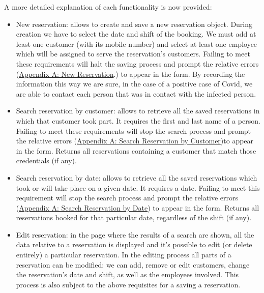 \documentclass{article}
\begin{document}
    
    A more detailed explanation of each functionality is now provided:

    \begin{itemize}
        \item New reservation: allows to create and save a new reservation object.
        During creation we have to select the date and shift of the booking.
        We must add at least one customer (with its mobile
        number) and select at least one employee which will be assigned to serve
        the reservation's customers.
        Failing to meet these requirements will halt the saving
        process and prompt the relative errors
        (\hyperref[sec:new_reservation_form_errors]{Appendix A: New Reservation}.)
        to appear in the form.
        By recording the information this way we are sure, in the case of
        a positive case of Covid, we are able to contact each person that
        was in contact with the infected person.


        \item Search reservation by customer: allows to retrieve all the saved
        reservations in which that customer took part.
        It requires the first and last name of a person.
        Failing to meet these requirements will stop the search process
        and prompt the relative errors
        (\hyperref[sec:search_reservation_by_customer_errors]
        {Appendix A: Search Reservation by Customer})to appear in the form.
        Returns all reservations containing a customer that match
        those credentials (if any).

        \item Search reservation by date: allows to retrieve all the saved reservations
        which took or will take place on a given date.
        It requires a date. Failing to meet this requirement will stop the search
        process and prompt the relative errors
        (\hyperref[sec:search_reservation_by_date_errors]{Appendix A: Search Reservation
        by Date}) to appear in the form.
        Returns all reservations booked for that particular date,
        regardless of the shift (if any).

        \item Edit reservation: in the page where the results of a search are shown,
        all the data relative to a reservation is displayed and it's possible
        to edit (or delete entirely) a particular reservation.
        In the editing process all parts of a reservation can be modified:
        we can add, remove or edit customers, change the reservation's date and shift,
        as well as the employees involved. This process is also subject to the
        above requisites for a saving a reservation.
    \end{itemize}
\end{document}
